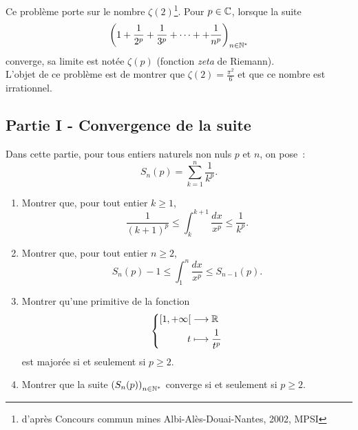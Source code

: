 Ce problème porte sur le nombre $\zeta(2)$\footnote{d'après Concours commun mines Albi-Alès-Douai-Nantes, 2002, MPSI}.
Pour $p\in \mathbb{C}$, lorsque la suite
\begin{displaymath}
 \left(1+\frac{1}{2^{p}}+\frac{1}{3^{p}}+\cdots++\frac{1}{n^{p}} \right)_{n\in \mathbb{N}^*}
\end{displaymath}
converge, sa limite est notée $\zeta(p)$ (fonction \emph{zeta} de Riemann). \\ L'objet de ce problème est de montrer que $\zeta(2)=\displaystyle \frac{\pi^2}{6}$ et que ce nombre est irrationnel.
\subsection*{Partie I - Convergence de la suite}
Dans cette partie, pour tous entiers naturels non nuls $p$ et $n$, on pose~:
\begin{displaymath}
 S_n(p)=\sum_{k=1}^n\frac{1}{k^p}.
\end{displaymath}
\begin{enumerate}
 \item Montrer que, pour tout entier $k\geq 1$,
\begin{displaymath}
 \frac{1}{(k+1)^p}\leq \int_k^{k+1}\frac{dx}{x^p}\leq \frac{1}{k^p}.
\end{displaymath}
\item Montrer que, pour tout entier $n\geq2$,
\begin{displaymath}
 S_n(p)-1\leq \int_1^{n}\frac{dx}{x^p}\leq S_{n-1}(p).
\end{displaymath}
\item Montrer qu'une primitive de la fonction
\begin{displaymath}
 \left\lbrace
\begin{aligned}
 \left[ 1,+\infty\right[   & \longrightarrow  \mathbb{R} \\
 t &\longmapsto \displaystyle \frac{1}{t^p}
\end{aligned}
\right.
\end{displaymath}
est majorée si et seulement si $p\geq 2$.
\item Montrer que la suite $\left( S_n(p)\right) _{n\in \mathbb{N}^*}$ converge si et seulement si $p\geq 2$.
\end{enumerate}

